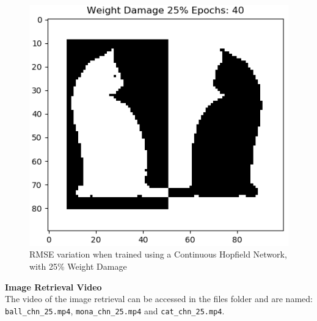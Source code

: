 \documentclass[12pt,a4paper]{article}
\newcommand{\noi}{\noindent}
\def\tt#1{\texttt{#1}}
\begin{document}
\begin{figure}[H]
\includegraphics[scale=0.34]{images/cat_chn_25_end.png}
\caption{RMSE variation when trained using a Continuous Hopfield Network, with 25\% Weight Damage}
\end{figure}

\noi
\textbf{Image Retrieval Video}\\
The video of the image retrieval can be accessed in the files folder and are named: \tt{ball\_chn\_25.mp4}, \tt{mona\_chn\_25.mp4} and \tt{cat\_chn\_25.mp4}.
\end{document}
